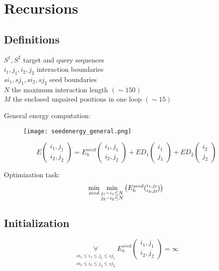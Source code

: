 \section{Recursions}

\subsection{Definitions}

$S^1, S^2$ target and query sequences\\
$i_1, j_1, i_2, j_2$ interaction boundaries\\
$si_1, sj_1, si_2, sj_2$ seed boundaries\\
$N$ the maximum interaction length $(\sim 150)$\\
$M$ the enclosed unpaired positions in one loop $(\sim 15)$

General energy computation:

\begin{figure}[H]
	\centering
	\texttt{[image: seedenergy\_general.png]}
\end{figure}

\begin{equation*}
E(\substack{i_1,j_1\\i_2,j_2}) = E_{h}^{seed}(\substack{i_1,j_1\\i_2,j_2}) + ED_{1}(\substack{i_1\\j_1}) + ED_{2}(\substack{i_2\\j_2})
\end{equation*}

Optimization task:
\begin{equation*}
\min\limits_{seed}
\min\limits_{\substack{j_{1}-i_{1} \le N\\j_{2}-i_{2} \le N}}
\begin{pmatrix}
E_{h}^{seed}(\substack{i_1,j_1\\i_2,j_2})
\end{pmatrix}\\
\end{equation*}

\subsection{Initialization}

\begin{equation*}
\underset{{\substack{si_1 \le i_{1} \le j_{1} \le sj_{1}\\si_2 \le i_{2} \le j_{2} \le sj_{2}}}}{\forall} E_{h}^{seed}(\substack{i_1,j_1\\i_2,j_2}) = \infty
\end{equation*}

